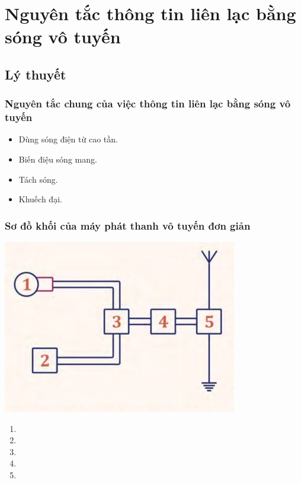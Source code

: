 \let\lesson\undefined
\newcommand{\lesson}{\phantomlesson{Bài 23: Nguyên tắc thông tin liên lạc bằng sóng vô tuyến}}
\chapter[Nguyên tắc thông tin liên lạc bằng sóng vô tuyến]{Nguyên tắc thông tin liên lạc bằng sóng vô tuyến}
\section{Lý thuyết}
\subsection {Nguyên tắc chung của việc thông tin liên lạc bằng sóng vô tuyến}
\begin{itemize}
	\item Dùng sóng điện từ cao tần.
	\item Biến điệu sóng mang.
	\item Tách sóng.
	\item Khuếch đại.
\end{itemize}
\subsection {Sơ đồ khối của máy phát thanh vô tuyến đơn giản}
\begin{center}
	\includegraphics[scale=0.5]{../figs/4-4-1.JPG}
\end{center}
\begin{enumerate}
	\item {}
	\item {}
	\item {}
	\item {}
	\item  {}
\end{enumerate}
